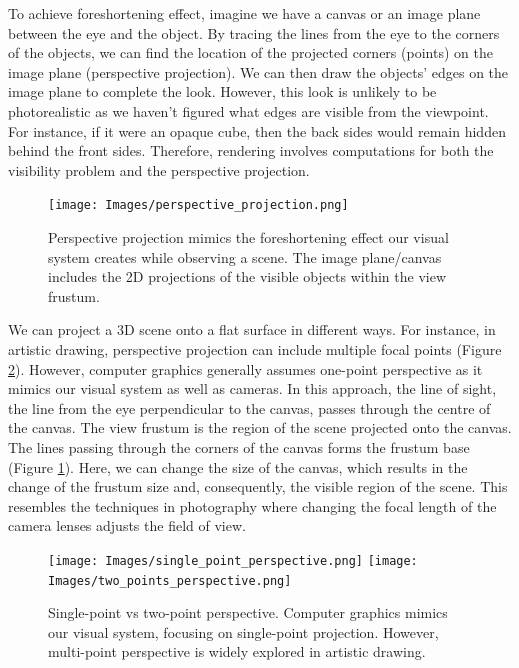 To achieve foreshortening effect, imagine we have a canvas or an image plane between the eye and the object. By tracing the lines from the eye to the corners of the objects, we can find the location of the projected corners (points) on the image plane (perspective projection). We can then draw the objects' edges on the image plane to complete the look. However, this look is unlikely to be photorealistic as we haven't figured what edges are visible from the viewpoint. For instance, if it were an opaque cube, then the back sides would remain hidden behind the front sides. Therefore, rendering involves computations for both the visibility problem and the perspective projection. 

\begin{figure}[ht]
  \centering
   \texttt{[image: Images/perspective\_projection.png]}
   \caption{Perspective projection mimics the foreshortening effect our visual system creates while observing a scene. The image plane/canvas includes the 2D projections of the visible objects within the view frustum.}
   \label{fig:perspective_projection}
\end{figure}


We can project a 3D scene onto a flat surface in different ways. For instance, in artistic drawing, perspective projection can include multiple focal points (Figure \ref{fig:artistic_drawing}). However, computer graphics generally assumes one-point perspective as it mimics our visual system as well as cameras. In this approach, the line of sight, the line from the eye perpendicular to the canvas, passes through the centre of the canvas. The view frustum is the region of the scene projected onto the canvas. The lines passing through the corners of the canvas forms the frustum base (Figure \ref{fig:perspective_projection}). Here, we can change the size of the canvas, which results in the change of the frustum size and, consequently, the visible region of the scene. This resembles the techniques in photography where changing the focal length of the camera lenses adjusts the field of view.

\begin{figure}[ht]
  \centering
   \texttt{[image: Images/single\_point\_perspective.png]}
    \texttt{[image: Images/two\_points\_perspective.png]}

   \caption{Single-point vs two-point perspective. Computer graphics mimics our visual system, focusing on single-point projection. However, multi-point perspective is widely explored in artistic drawing.}
   \label{fig:artistic_drawing}
\end{figure}


